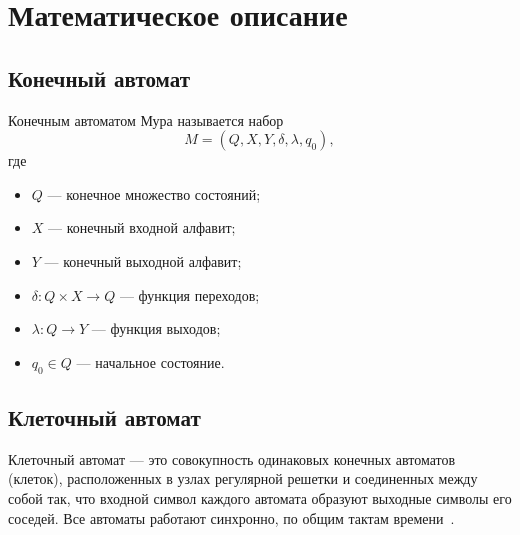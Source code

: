 \newpage
\section{Математическое описание}
\label{sec:math}

\subsection{Конечный автомат}

Конечным автоматом Мура называется набор
\[
	M = (Q, X, Y, \delta, \lambda, q_0),
\]
где
\begin{itemize}
	\item $Q$ --- конечное множество состояний;
	\item $X$ --- конечный входной алфавит;
	\item $Y$ --- конечный выходной алфавит;
	\item $\delta: Q \times X \to Q$ --- функция переходов;
	\item $\lambda: Q \to Y$ --- функция выходов;
	\item $q_0 \in Q$ --- начальное состояние.
\end{itemize}



\subsection{Клеточный автомат}
\label{sec:ca}

Клеточный автомат --- это совокупность одинаковых конечных автоматов (клеток), расположенных в узлах регулярной решетки и соединенных между собой так, что входной символ каждого автомата образуют выходные символы его соседей. Все автоматы работают синхронно, по общим тактам времени~\cite{tema, neumann}.

